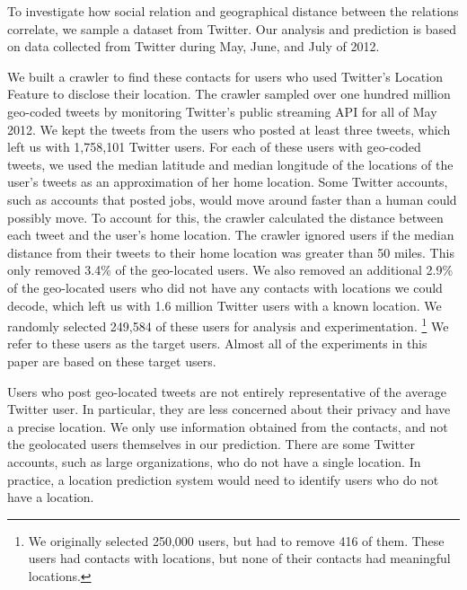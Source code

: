 To investigate how social relation and geographical distance between the
relations correlate, we sample a dataset from Twitter.
%
Our analysis and prediction is based on data collected from Twitter during
May, June, and July of 2012.

We built a crawler to find these contacts for users who used Twitter's Location
Feature to disclose their location.
%
The crawler sampled over one hundred million geo-coded tweets by monitoring
Twitter's public streaming API for all of May 2012.
We kept the tweets from the users who posted at least three tweets, which left
us with 1,758,101 Twitter users.
%
For each of these users with geo-coded tweets, we used the median latitude and
median longitude of the locations of the user's tweets as an approximation of
her home location.
%
Some Twitter accounts, such as accounts that posted jobs, would
move around faster than a human could possibly move.
%
To account for this, the crawler calculated the distance between each tweet and
the user's home location.
%
The crawler ignored users if the median distance from their tweets to their
home location was greater than 50 miles.
%
This only removed 3.4\% of the geo-located users.
%
We also removed an additional 2.9\% of the geo-located users who did not have
any contacts with locations we could decode, which left us with 1.6 million
Twitter users with a known location.
%
We randomly selected 249,584 of these users for analysis and experimentation.
\footnote{We originally selected 250,000 users, but had to remove 416 of them.
These users had contacts with locations, but none of their contacts had
meaningful locations.}
%
We refer to these users as the target users.
%
Almost all of the experiments in this paper are based on these target
users.

Users who post geo-located tweets are not entirely representative of the
average Twitter user.
%
In particular, they are less concerned about their privacy and have a precise
location.
%
We only use information obtained from the contacts, and not the geolocated
users themselves in our prediction.
%
There are some Twitter accounts, such as large organizations, who do not have a
single location.
%
In practice, a location prediction system would need to identify users who do
not have a location.




